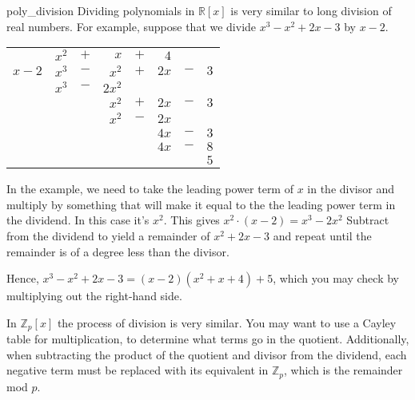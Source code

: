 \begin{example}{poly_division} 
Dividing polynomials in $\mathbb{R}[x]$ is very similar to long division of real numbers.  
 For example,
suppose that we divide $x^3 - x^2 + 2 x - 3$ by $x - 2$.  
\begin{center}
\begin{tabular}{rrcrcrcr}
        &  $x^2$  &  $+$  &      $x$  &  $+$  &    $4$  &       &       \\ \cline{2-8}
 \multicolumn{1}{r|}{$x - 2$}
        &  $x^3$  &  $-$  &    $x^2$  &  $+$  &  $2 x$  &  $-$  &  $3$  \\
        &  $x^3$  &  $-$  &  $2 x^2$  &       &         &       &       \\ \cline{2-8}
        &         &       &    $x^2$  &  $+$  &  $2 x$  &  $-$  &  $3$  \\
        &         &       &    $x^2$  &  $-$  &  $2 x$  &       &       \\ \cline{4-8}
        &         &       &           &       &  $4 x$  &  $-$  &  $3$  \\
        &         &       &           &       &  $4 x$  &  $-$  &  $8$  \\ \cline{6-8}
        &         &       &           &       &         &       &  $5$
\end{tabular}
\end{center}
In the example, we need to take the leading power term of $x$ in the divisor and multiply by something that will make it equal to the the leading power term in the dividend.  In this case it's $x^2$.  This gives $x^2\cdot(x-2) = x^3 - 2x^2$  Subtract from the dividend to yield a remainder of $x^2 + 2x - 3$ and repeat until the remainder is of a degree less than the divisor.
 
Hence, $x^3 - x^2 + 2 x - 3 = (x - 2) (x^2 + x + 4 ) + 5$, which you may check by multiplying out the right-hand side.
\end{example}
In $\mathbb{Z}_p[x]$ the process of division is very similar. You may want to use a Cayley table for multiplication, to determine what terms go in the quotient.  Additionally, when subtracting the product of the quotient and divisor from the dividend, each negative term must be replaced with its equivalent in $\mathbb{Z}_p$, which is the remainder mod $p$.


